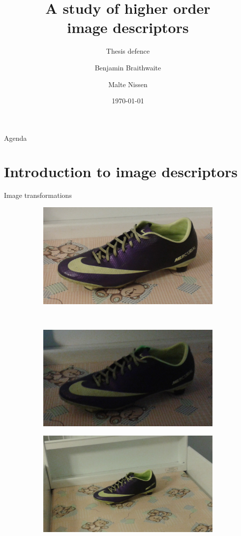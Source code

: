 \documentclass[14pt,t]{beamer}
\title{A study of higher order \\ image descriptors}
\subtitle{Thesis defence}
\author{Benjamin Braithwaite \\\and Malte Nissen}
\institute{Department of Computer Science}
\date[]{\today}
\begin{document}
%
\frame[plain]{\titlepage}
%
\begin{frame}{Agenda}
	\tableofcontents
\end{frame}
%
\section{Introduction to image descriptors}
%
\begin{frame}{Image transformations}
\begin{figure}
\centering
	\begin{subfigure}[t]{0.4\textwidth}
		\includegraphics[width=\textwidth]{img/shoeOriginal.jpg}
	\end{subfigure}\\
	\vspace{0.75mm}
	\begin{subfigure}[t]{0.4\textwidth}
		\includegraphics[width=\textwidth]{img/shoeDark.jpg}
	\end{subfigure}
	\begin{subfigure}[t]{0.4\textwidth}
		\includegraphics[width=\textwidth]{img/shoeScale.jpg}

\end{subfigure}
\end{figure}
\end{frame}
\end{document}

